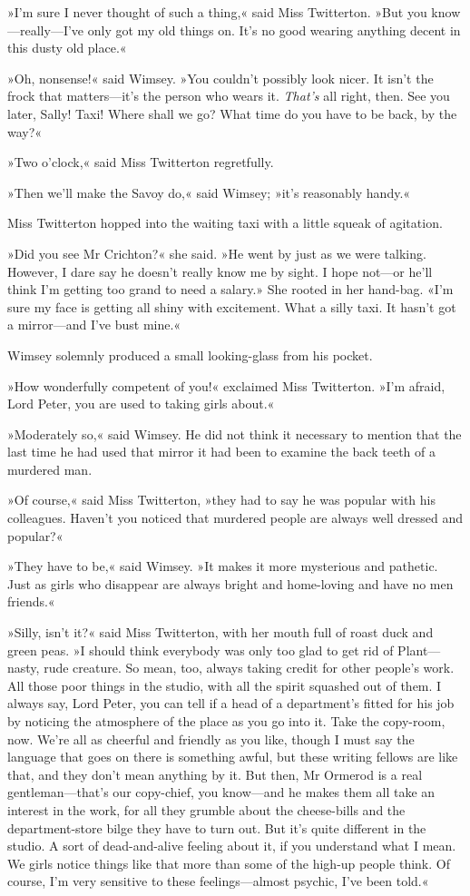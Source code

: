 »I'm sure I never thought of such a thing,« said Miss Twitterton. »But you know—really—I've only got my old things on. It's no good wearing anything decent in this dusty old place.«

»Oh, nonsense!« said Wimsey. »You couldn't possibly look nicer. It isn't the frock that matters—it's the person who wears it. \textit{That's} all right, then. See you later, Sally! Taxi! Where shall we go? What time do you have to be back, by the way?«

»Two o'clock,« said Miss Twitterton regretfully.

»Then we'll make the Savoy do,« said Wimsey; »it's reasonably handy.«

Miss Twitterton hopped into the waiting taxi with a little squeak of agitation.

»Did you see Mr Crichton?« she said. »He went by just as we were talking. However, I dare say he doesn't really know me by sight. I hope not—or he'll think I'm getting too grand to need a salary.» She rooted in her hand-bag. «I'm sure my face is getting all shiny with excitement. What a silly taxi. It hasn't got a mirror—and I've bust mine.«

Wimsey solemnly produced a small looking-glass from his pocket.

»How wonderfully competent of you!« exclaimed Miss Twitterton. »I'm afraid, Lord Peter, you are used to taking girls about.«

»Moderately so,« said Wimsey. He did not think it necessary to mention that the last time he had used that mirror it had been to examine the back teeth of a murdered man.

»Of course,« said Miss Twitterton, »they had to say he was popular with his colleagues. Haven't you noticed that murdered people are always well dressed and popular?«

»They have to be,« said Wimsey. »It makes it more mysterious and pathetic. Just as girls who disappear are always bright and home-loving and have no men friends.«

»Silly, isn't it?« said Miss Twitterton, with her mouth full of roast duck and green peas. »I should think everybody was only too glad to get rid of Plant—nasty, rude creature. So mean, too, always taking credit for other people's work. All those poor things in the studio, with all the spirit squashed out of them. I always say, Lord Peter, you can tell if a head of a department's fitted for his job by noticing the atmosphere of the place as you go into it. Take the copy-room, now. We're all as cheerful and friendly as you like, though I must say the language that goes on there is something awful, but these writing fellows are like that, and they don't mean anything by it. But then, Mr Ormerod is a real gentleman—that's our copy-chief, you know—and he makes them all take an interest in the work, for all they grumble about the cheese-bills and the department-store bilge they have to turn out. But it's quite different in the studio. A sort of dead-and-alive feeling about it, if you understand what I mean. We girls notice things like that more than some of the high-up people think. Of course, I'm very sensitive to these feelings—almost psychic, I've been told.«

